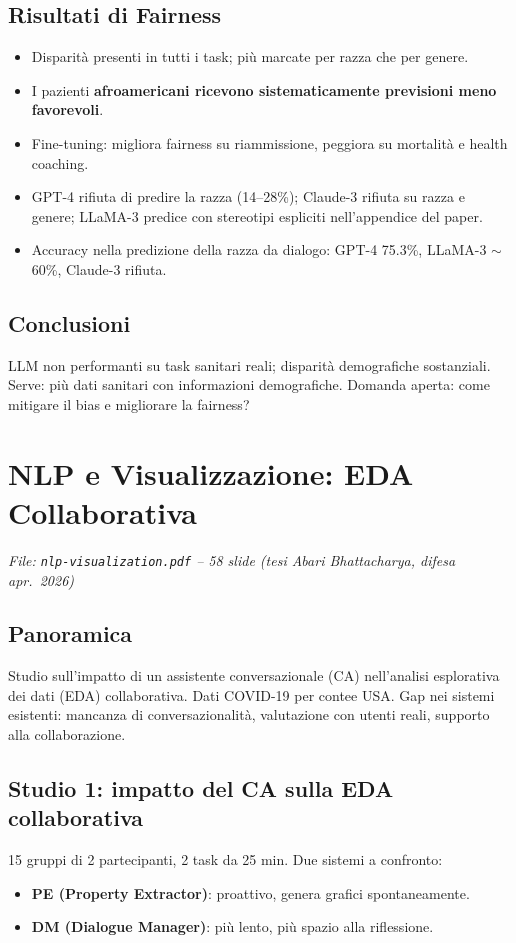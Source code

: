\documentclass[a4paper,12pt]{article}
\begin{document}
\subsection{Risultati di Fairness}
\begin{itemize}
    \item Disparit\`a presenti in tutti i task; pi\`u marcate per razza che per genere.
    \item I pazienti \textbf{afroamericani ricevono sistematicamente previsioni meno favorevoli}.
    \item Fine-tuning: migliora fairness su riammissione, peggiora su mortalit\`a e health coaching.
    \item GPT-4 rifiuta di predire la razza (14--28\%); Claude-3 rifiuta su razza e genere; LLaMA-3 predice con stereotipi espliciti nell'appendice del paper.
    \item Accuracy nella predizione della razza da dialogo: GPT-4 75.3\%, LLaMA-3 $\sim$60\%, Claude-3 rifiuta.
\end{itemize}

\subsection{Conclusioni}
LLM non performanti su task sanitari reali; disparit\`a demografiche sostanziali. Serve: pi\`u dati sanitari con informazioni demografiche. Domanda aperta: come mitigare il bias e migliorare la fairness?

\section{NLP e Visualizzazione: EDA Collaborativa}
\textit{File: \texttt{nlp-visualization.pdf} -- 58 slide (tesi Abari Bhattacharya, difesa apr.\ 2026)}

\subsection{Panoramica}
Studio sull'impatto di un assistente conversazionale (CA) nell'analisi esplorativa dei dati (EDA) collaborativa. Dati COVID-19 per contee USA. Gap nei sistemi esistenti: mancanza di conversazionalit\`a, valutazione con utenti reali, supporto alla collaborazione.

\subsection{Studio 1: impatto del CA sulla EDA collaborativa}
15 gruppi di 2 partecipanti, 2 task da 25 min. Due sistemi a confronto:
\begin{itemize}
    \item \textbf{PE (Property Extractor)}: proattivo, genera grafici spontaneamente.
    \item \textbf{DM (Dialogue Manager)}: pi\`u lento, pi\`u spazio alla riflessione.
\end{itemize}
\end{document}
